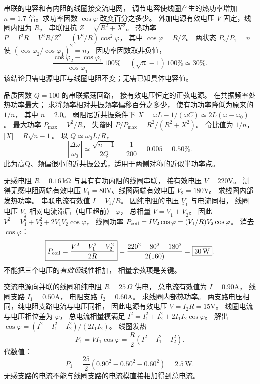 串联的电容和有内阻的线圈接交流电网，
调节电容使线圈产生的热功率增加
$n=1.7$ 倍。求功率因数 $\cos\varphi$ 改变百分之多少。
\exsolution
外加电源有效电压 $V$ 固定，线圈内阻为 $R$，
串联阻抗
$Z=\sqrt{R^2+X^2}$。
热功率
$P=I^2R=V^2R/Z^2
=(V^2/R)\cos^2\varphi$，
其中 $\cos\varphi=R/Z$。
两状态
$P_2/P_1=n$
使
$(\cos\varphi_2/\cos\varphi_1)^2=n$，
因功率因数取非负值，
\[
\boxed{\frac{\cos\varphi_2-\cos\varphi_1}
{\cos\varphi_1}\,100\%
=(\sqrt n-1)\,100\%\simeq30\%}.
\]
\excheck 该结论只需电源电压与线圈电阻不变；无需已知具体电容值。

品质因数 $Q=100$ 的串联振荡回路，
接有效电压恒定的正弦电源。
在共振频率处热功率最大；
求将频率相对共振频率偏移百分之多少，
使有功功率降低为原来的 $1/n$，
其中 $n=2.0$。
\exsolution
弱阻尼近共振条件下
$X=\omega L-1/(\omega C)
\simeq2L(\omega-\omega_0)$。
最大功率
$P_{\max}=V^2/R$，
失谐时
$P/P_{\max}=R^2/(R^2+X^2)$。
令比值为 $1/n$，
$|X|=R\sqrt{n-1}$。
以 $Q\simeq\omega_0L/R$，
\[
\boxed{\left|\frac{\Delta\omega}{\omega_0}\right|
\simeq\frac{\sqrt{n-1}}{2Q}
=\frac1{200}=0.005=0.50\%}.
\]
\excheck 此为高Q、频偏很小的近共振公式，适用于两侧对称的近似半功率点。

无感电阻 $R=0.16\,\mathrm{k\Omega}$
与具有有功内阻的线圈串联，
接有效电压 $V=220$V。
测得无感电阻两端有效电压
$V_1=80$V、线圈两端有效电压
$V_2=180$V。
求线圈内部发热功率。
\exsolution
串联电流有效值
$I=V_1/R$。
因纯电阻的电压 $\underline V_1$ 与电流同相，
线圈电压 $\underline V_2$ 相对电流滞后（电压超前） $\varphi$，
总相量
$\underline V=\underline V_1+\underline V_2$。
因此
$V^2=V_1^2+V_2^2+2V_1V_2\cos\varphi$，
线圈功率
$P_{\rm coil}=IV_2\cos\varphi
=(V_1/R)V_2\cos\varphi$。
消去 $\cos\varphi$：
\[
\boxed{P_{\rm coil}=
\frac{V^2-V_1^2-V_2^2}{2R}}
=\frac{220^2-80^2-180^2}{2(160)}
=\boxed{30\,\mathrm W}.
\]
\excheck 不能把三个电压的\emph{有效值}线性相加，
相量余弦项是关键。

交流电源向并联的线圈和纯电阻
$R=25\,\Omega$ 供电，
总电流有效值为 $I=0.90$A，
线圈支路 $I_1=0.50$A，
电阻支路 $I_2=0.60$A。
求线圈内部热功率。
\exsolution
两支路电压相同，纯电阻支路电流与电压同相，
因此电源有效电压
$V=I_2R=15$V。
线圈电流与电压相位差为 $\varphi$，
总电流相量模满足
$I^2=I_1^2+I_2^2+2I_1I_2\cos\varphi$。
解出
$\cos\varphi=(I^2-I_1^2-I_2^2)/(2I_1I_2)$。
线圈发热
\[
P_1=VI_1\cos\varphi
=\frac R2\left(I^2-I_1^2-I_2^2\right).
\]
代数值：
\[
\boxed{P_1=\frac{25}{2}(0.90^2-0.50^2-0.60^2)
=2.5\,\mathrm W}.
\]
\excheck 无感支路的电流不能与线圈支路的电流模直接相加得到总电流。

